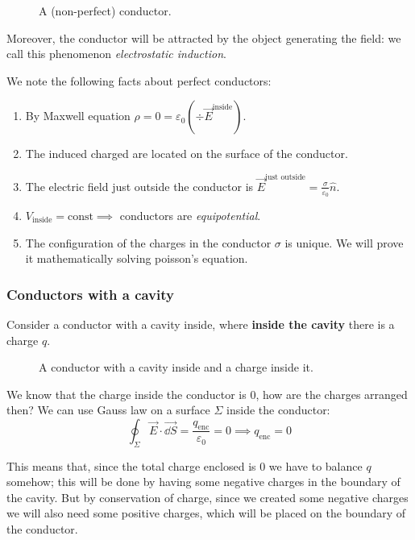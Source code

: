 \documentclass[12pt]{extarticle}
\begin{document}
\begin{figure}[H]
	\centering
	
	\caption{A (non-perfect) conductor.}
\end{figure}

Moreover, the conductor will be attracted by the object generating the field: we call this phenomenon \emph{electrostatic induction}.

We note the following facts about perfect conductors:
\begin{enumerate}
	\item By Maxwell equation $\rho = 0 = \varepsilon_0 (\div \vec E^\text{inside})$.
	\item The induced charged are located on the surface of the conductor.
	\item The electric field just outside the conductor is $\vec E^\text{just outside} = \frac{\sigma}{\varepsilon_0} \hat n$.
	\item $V_\text{inside} = \text{const} \implies$ conductors are \emph{equipotential}.
	\item The configuration of the charges in the conductor $\sigma$ is unique.
	      We will prove it mathematically solving poisson's equation.
\end{enumerate}

\subsubsection{Conductors with a cavity}

Consider a conductor with a cavity inside, where \textbf{inside the cavity} there is a charge $q$.

\begin{figure}[H]
	\centering
	
	\caption{A conductor with a cavity inside and a charge inside it.}
\end{figure}

We know that the charge inside the conductor is $0$, how are the charges arranged then?
We can use Gauss law on a surface $\Sigma$ inside the conductor:
\begin{equation}
	\oint_\Sigma \vec E \cdot \vec{\dd{S}} = \frac{q_\text{enc}}{\varepsilon_0} = 0 \implies q_\text{enc} = 0
\end{equation}

This means that, since the total charge enclosed is $0$ we have to balance $q$ somehow; this will be done by having some negative charges in the boundary of the cavity.
But by conservation of charge, since we created some negative charges we will also need some positive charges, which will be placed on the boundary of the conductor.
\end{document}
